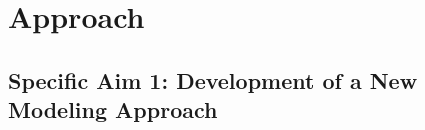\documentclass[12pt, class=article, crop=false]{standalone}
\begin{document}


\section{Approach}

\subsection*{Specific Aim 1: Development of a New Modeling Approach}
\end{document}
